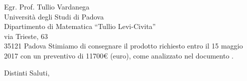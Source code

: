 \documentclass[a4paper]{letter} %
\begin{document}
\begin{letter}{Egr. Prof. Tullio Vardanega\\
Università degli Studi di Padova\\
Dipartimento di Matematica “Tullio Levi-Civita”\\
via Trieste, 63\\
35121 Padova}
Stimiamo di consegnare il prodotto richiesto entro il 15 maggio 2017 con un preventivo di \num{11700}\euro{} (euro), come analizzato nel documento \PdP.

\closing{Distinti Saluti,}

\end{letter}
\end{document}
